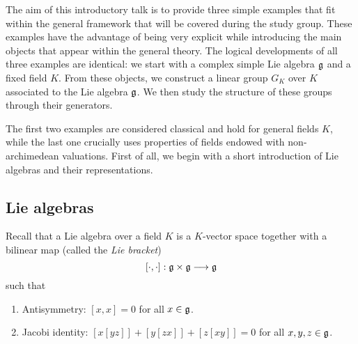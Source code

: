The aim of this introductory talk is to provide three simple examples that fit within the general framework that will be covered during the study group. These examples have the advantage of being very explicit while introducing the main objects that appear within the general theory. The logical developments of all three examples are identical: we start with a complex simple Lie algebra $\mathfrak{g}$ and a fixed field $K$. From these objects, we construct a linear group $G_K$ over $K$ associated to the Lie algebra $\mathfrak{g}$. We then study the structure of these groups through their generators. 

The first two examples are considered classical and hold for general fields $K$, while the last one crucially uses properties of fields endowed with non-archimedean valuations. First of all, we begin with a short introduction of Lie algebras and their representations.

\subsection{Lie algebras}
Recall that a Lie algebra over a field $K$ is a $K$-vector space together with a bilinear map (called the \textit{Lie bracket}) $$[\cdot,\cdot]:\mathfrak{g}\times\mathfrak{g}\longrightarrow \mathfrak{g}$$
such that 
\begin{enumerate}
    \item Antisymmetry: $[x,x]=0$ for all $x\in\mathfrak{g}$.
    \item Jacobi identity: $[x[yz]]+[y[zx]]+[z[xy]]=0$ for all $x,y,z\in\mathfrak{g}$.
\end{enumerate}

